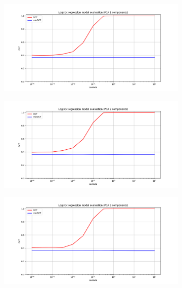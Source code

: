 \documentclass[12pt]{report}
\begin{document}
\begin{figure}[H]
    \centering
    \begin{subfigure}[t]{0.32\textwidth}
        \includegraphics[width=\textwidth]{./plot/LR/log_reg_pca1.png}
    \end{subfigure}
    \hfill
    \begin{subfigure}[t]{0.32\textwidth}
        \includegraphics[width=\textwidth]{./plot/LR/log_reg_pca2.png}
    \end{subfigure}
    \hfill
    \begin{subfigure}[t]{0.32\textwidth}
        \includegraphics[width=\textwidth]{./plot/LR/log_reg_pca3.png}

\end{subfigure}
\end{figure}
\end{document}
